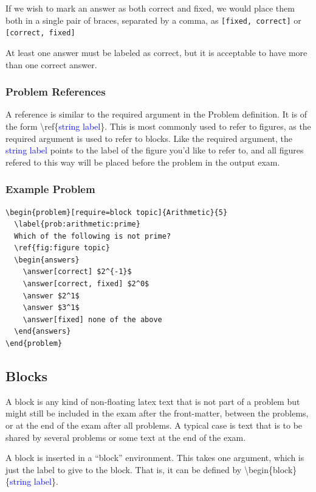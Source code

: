 \documentclass{article}
\begin{document}
If we wish to mark an answer as both correct and fixed, we would place them both in a single pair of braces, separated by a comma, as \texttt{[fixed, correct]} or \texttt{[correct, fixed]}

At least one answer must be labeled as correct, but it is acceptable to have more than one correct answer.

\subsubsection{Problem References}
A reference is similar to the required argument in the Problem definition. It is of the form \textbackslash{ref}\{\textcolor{blue}{string label}\}. This is most commonly used to refer to figures, as the required argument is used to refer to blocks. Like the required argument, the \textcolor{blue}{string label} points to the label of the figure you'd like to refer to, and all figures refered to this way will be placed before the problem in the output exam.

\subsubsection{Example Problem}
\begin{verbatim}
\begin{problem}[require=block topic]{Arithmetic}{5}
  \label{prob:arithmetic:prime}
  Which of the following is not prime?
  \ref{fig:figure topic}
  \begin{answers}
    \answer[correct] $2^{-1}$
    \answer[correct, fixed] $2^0$
    \answer $2^1$
    \answer $3^1$
    \answer[fixed] none of the above
  \end{answers}
\end{problem}
\end{verbatim}


\subsection{Blocks}
A block is any kind of non-floating latex text that is not part of a problem but might still be included in the exam after the front-matter, between the problems, or at the end of the exam after all problems. A typical case is text that is to be shared by several problems or some text at the end of the exam.

A block is inserted in a ``block'' environment. This takes one argument, which is just the label to give to the block. That is, it can be defined by \textbackslash{begin}\{block\}\{\textcolor{blue}{string label}\}.
\end{document}
